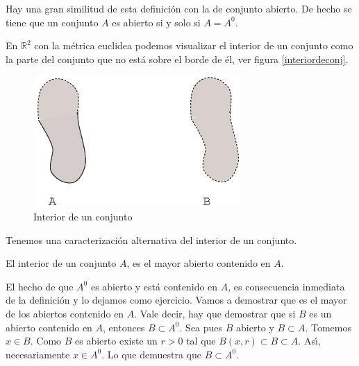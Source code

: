 Hay una gran similitud de esta definici\'on con la de conjunto
abierto. De hecho se tiene que un conjunto $A$ es abierto si y
solo si $A=A^0$.

En $\mathbb{R}^2$ con la m\'etrica euclidea podemos visualizar el
interior de un conjunto como la parte del conjunto que no est\'a
sobre el borde de \'el, ver figura \vref{interiordeconj}.

\begin{figure}
\begin{center}
	\includegraphics[height=5cm, width=8cm]{interio.eps}
	\caption{Interior de un conjunto}\label{interiordeconj}
\end{center}
\end{figure}

Tenemos una caracterizaci\'on alternativa del interior de un
conjunto.

\begin{teorema}\label{teo,mayorabierto} El interior de un conjunto $A$, es el mayor abierto
contenido en $A$.
\end{teorema}
\begin{demo} El hecho de que $A^0$ es abierto y est\'a contenido
en $A$, es consecuencia inmediata de la definici\'on y lo dejamos
como ejercicio. Vamos a demostrar que es el mayor de los abiertos
contenido en $A$. Vale decir, hay que demostrar que si $B$ es un
abierto contenido en $A$, entonces $B\subset A^0$. Sea pues $B$
abierto y $B\subset A$. Tomemos $x\in B$. Como $B$ es abierto
existe un $r>0$ tal que $B(x,r)\subset B\subset A$. As\'{\i},
necesariamente $x\in A^0$. Lo que demuestra que $B\subset A^0$.
\end{demo}

